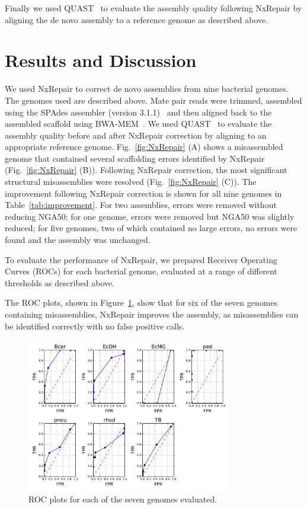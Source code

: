 \documentclass[fleqn,10pt]{wlpeerj}
\begin{document}
Finally we used QUAST~\citep{gurevich2013} to evaluate the assembly quality following NxRepair by aligning the de novo assembly to a reference genome as described above.


\section*{Results and Discussion}
We used NxRepair to correct de novo assemblies from nine bacterial genomes. The genomes used are described above. Mate pair reads were trimmed, assembled using the SPAdes assembler (version 3.1.1)~\citep{bankevich2012} and then aligned back to the assembled scaffold using BWA-MEM~\citep{li2013}. We used QUAST~\citep{gurevich2013} to evaluate the assembly quality before and after NxRepair correction by aligning to an appropriate reference genome. Fig.~\ref{fig:NxRepair} (A) shows a misassembled genome that contained several scaffolding errors identified by NxRepair (Fig.~\ref{fig:NxRepair} (B)). Following NxRepair correction, the most significant structural misassemblies were resolved (Fig.~\ref{fig:NxRepair} (C)). The improvement following NxRepair correction is shown for all nine genomes in Table~\ref{tab:improvement}. For two assemblies, errors were removed without reducing NGA50; for one genome, errors were removed but NGA50 was slightly reduced; for five genomes, two of which contained no large errors, no errors were found and the assembly was unchanged.

To evaluate the performance of NxRepair, we prepared Receiver Operating Curves (ROCs) for each bacterial genome, evaluated at a range of different thresholds as described above. 

The ROC plots, shown in Figure~\ref{fig:ROCs}, show that for six of the seven genomes containing misassemblies, NxRepair improves the assembly, as misassemblies can be identified correctly with no false positive calls.

\begin{figure}
\centerline{\includegraphics[width=0.8\textwidth]{allROC_extensive.pdf}}
\caption{ROC plots for each of the seven genomes evaluated.\label{fig:ROCs}}
\end{figure}
\end{document}
